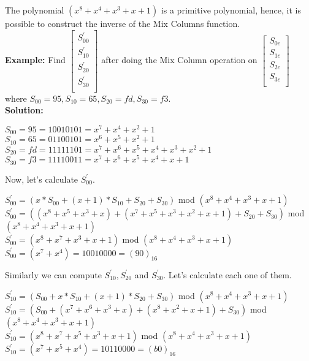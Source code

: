 \documentclass[11pt]{article}
\begin{document}
The polynomial $(x^8 + x^4 + x^3 + x + 1)$ is a primitive polynomial, hence, it is possible to construct the inverse of the Mix Columns function.\\
\newline
\textbf{Example:} Find $\begin{bmatrix}
        S_{00}^{'}\\
        S_{10}^{'}\\
        S_{20}^{'}\\
        S_{30}^{'}\\
    \end{bmatrix}$ after doing the Mix Column operation on $\begin{bmatrix}
        S_{0c}\\
        S_{1c}\\
        S_{2c}\\
        S_{3c}\\
    \end{bmatrix}$ where $S_{00} = 95, S_{10} = 65, S_{20} = fd, S_{30} = f3$.\\

\textbf{Solution:}
\begin{center}
    $S_{00} = 95 = 10010101 = x^7 + x^4 + x^2 + 1$\\
    $S_{10} = 65 = 01100101 = x^6 + x^5 + x^2 + 1$\\
    $S_{20} = fd = 11111101 = x^7 + x^6 + x^5 + x^4 + x^3 + x^2 + 1$\\
    $S_{30} = f3 = 11110011 = x^7 + x^6 + x^5 + x^4 + x + 1$\\
\end{center}
Now, let's calculate $S_{00}^{'}$.
\begin{center}
    $S_{00}^{'} = (x * S_{00} + (x+1) * S_{10} + S_{20} + S_{30})$ mod $(x^8 + x^4 + x^3 + x + 1)$\\
    \vspace{1mm}
    $S_{00}^{'} = ((x^8 + x^5 + x^3 + x) + (x^7 + x^5 + x^3 + x^2 + x + 1) + S_{20} + S_{30})$ mod $(x^8 + x^4 + x^3 + x + 1)$\\
    \vspace{1mm}
    $S_{00}^{'} = (x^8 + x^7 + x^3 + x + 1)$ mod $(x^8 + x^4 + x^3 + x + 1)$\\
    \vspace{1mm}
    $S_{00}^{'} = (x^7 + x^4) = 10010000 = (90)_{16}$
\end{center}
Similarly we can compute $S_{10}^{'}, S_{20}^{'}$ and $S_{30}^{'}$. Let's calculate each one of them.
\begin{center}
    $S_{10}^{'} = (S_{00} + x * S_{10} + (x + 1) * S_{20} + S_{30})$ mod $(x^8 + x^4 + x^3 + x + 1)$\\
    \vspace{1mm}
    $S_{10}^{'} = (S_{00} + (x^7 + x^6 + x^3 + x) + (x^8 + x^2 + x + 1) + S_{30})$ mod $(x^8 + x^4 + x^3 + x + 1)$\\
    \vspace{1mm}
    $S_{10}^{'} = (x^8 + x^7 + x^5 + x^3 + x + 1)$ mod $(x^8 + x^4 + x^3 + x + 1)$\\
    \vspace{1mm}
    $S_{10}^{'} = (x^7 + x^5 + x^4) = 10110000 = (b0)_{16}$
\end{center}
\end{document}
